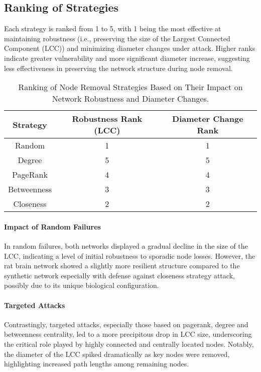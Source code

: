 \documentclass[
	report, %
	11pt, %
]{CSUniSchoolLabReport}
\newcounter{ct}
\begin{document}
\subsection{Ranking of Strategies}
Each strategy is ranked from 1 to 5, with 1 being the most effective at maintaining robustness (i.e., preserving the size of the Largest Connected Component (LCC)) and minimizing diameter changes under attack. Higher ranks indicate greater vulnerability and more significant diameter increase, suggesting less effectiveness in preserving the network structure during node removal.
\begin{table}[H]
	\centering
	\captionsetup{justification=centering}
	\begin{tabular}{|c|c|c|}
		\hline
		\rowcolor{SeaGreen} \textbf{Strategy} & \textbf{Robustness Rank (LCC)} & \textbf{Diameter Change Rank} \\ \hline
		Random            & 1                              & 1                             \\ \hline
		Degree            & 5                              & 5                             \\ \hline
		PageRank          & 4                              & 4                             \\ \hline
		Betweenness       & 3                              & 3                             \\ \hline
		Closeness         & 2                              & 2                             \\ \hline
	\end{tabular}
	\caption{Ranking of Node Removal Strategies Based on Their Impact on Network Robustness and Diameter Changes.}
\end{table}

\paragraph{Impact of Random Failures}
In random failures, both networks displayed a gradual decline in the size of the LCC, indicating a level of initial robustness to sporadic node losses. However, the rat brain network showed a slightly more resilient structure compared to the synthetic network especially with defense against closeness strategy attack, possibly due to its unique biological configuration.

\paragraph{Targeted Attacks}
Contrastingly, targeted attacks, especially those based on pagerank, degree and betweenness centrality, led to a more precipitous drop in LCC size, underscoring the critical role played by highly connected and centrally located nodes. Notably, the diameter of the LCC spiked dramatically as key nodes were removed, highlighting increased path lengths among remaining nodes.
\end{document}
